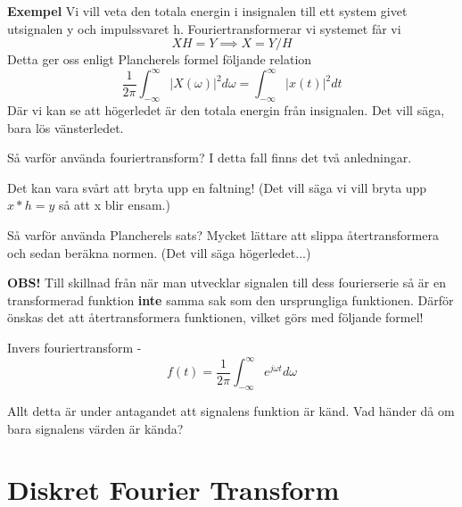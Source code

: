 \documentclass{article}
\begin{document}
\textbf{Exempel}
Vi vill veta den totala energin i insignalen till ett system givet utsignalen y
och impulssvaret h. Fouriertransformerar vi systemet får vi
\begin{displaymath}
  XH = Y \implies X = Y/H
\end{displaymath}
Detta ger oss enligt Plancherels formel följande relation
\begin{displaymath}
  \frac{1}{2 \pi} \int_{-\infty}^{\infty} |X(\omega)|^2 d \omega =
  \int_{-\infty}^{\infty} |x(t)|^2 d t
\end{displaymath}
Där vi kan se att högerledet är den totala energin från insignalen.
Det vill säga, bara lös vänsterledet.

Så varför använda fouriertransform? I detta fall finns det två anledningar.

Det kan vara svårt att bryta upp en faltning!
(Det vill säga vi vill bryta upp $x*h=y$ så att x blir ensam.)

Så varför använda Plancherels sats? Mycket lättare att slippa återtransformera
och sedan beräkna normen. (Det vill säga högerledet...)

\textbf{OBS!} Till skillnad från när man utvecklar signalen till dess
fourierserie så är en transformerad funktion \textbf{inte} samma sak
som den ursprungliga funktionen.
Därför önskas det att återtransformera funktionen, vilket görs med följande formel!

Invers fouriertransform -
\begin{displaymath}
  f(t) = \frac{1}{2 \pi} \int_{-\infty}^{\infty}  e^{j \omega t} d\omega
\end{displaymath}

Allt detta är under antagandet att signalens funktion är känd.
Vad händer då om bara signalens värden är kända?

\section{Diskret Fourier Transform}
\end{document}

